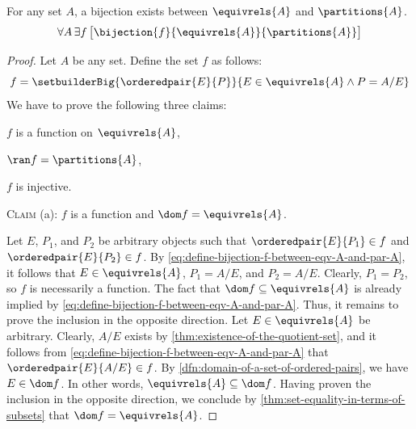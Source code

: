 \begin{thm}
    \label{thm:fundamental-theorem-of-equivalence-relations}
    For any set \( A \), a bijection exists between \( \equivrels{A} \) and \( \partitions{A} \).
    \begin{equation*}
        \forall A \, \exists f \, \big[ \bijection{f}{\equivrels{A}}{\partitions{A}} \big]
    \end{equation*}
\end{thm}

\begin{proof}
    Let \( A \) be any set. Define the set \( f \) as follows:
    \begin{equation}
        \label{eq:define-bijection-f-between-eqv-A-and-par-A}
        f = \setbuilderBig{\orderedpair{E}{P}}{E \in \equivrels{A} \land P = A / E }
    \end{equation}
    We have to prove the following three claims:
    \begin{enumerate*}[label=(\alph*)]
        \item \( f \) is a function on \( \equivrels{A} \),
        \item \( \ran f = \partitions{A} \),
        \item \( f \) is injective.
    \end{enumerate*}

    \vspace{0.5cm}
    \noindent
    {\scshape Claim} (a): \( f \) is a function and \( \dom f = \equivrels{A} \).

    \vspace{0.2cm}
    \noindent
    Let \( E \), \( P_{1} \), and \( P_{2} \) be arbitrary objects such that
    \( \orderedpair{E}{P_{1}} \in f \) and \( \orderedpair{E}{P_{2}} \in f \). By \eqref{eq:define-bijection-f-between-eqv-A-and-par-A},
    it follows that \( E \in \equivrels{A} \), \( P_{1} = A / E \), and \( P_{2} = A / E \). Clearly, \( P_{1} = P_{2} \),
    so \( f \) is necessarily a function. The fact that \( \dom f \subseteq \equivrels{A} \) is already implied by
    \eqref{eq:define-bijection-f-between-eqv-A-and-par-A}. Thus, it remains to prove the inclusion in the opposite direction.
    Let \( E \in \equivrels{A} \) be arbitrary. Clearly, \( A / E \) exists by \cref{thm:existence-of-the-quotient-set}, and
    it follows from \eqref{eq:define-bijection-f-between-eqv-A-and-par-A} that \( \orderedpair{E}{A / E} \in f \).
    By \cref{dfn:domain-of-a-set-of-ordered-pairs}, we have \( E \in \dom f \). In other words, \( \equivrels{A} \subseteq \dom f \).
    Having proven the inclusion in the opposite direction, we conclude by \cref{thm:set-equality-in-terms-of-subsets} that \( \dom f = \equivrels{A} \).


\end{proof}
